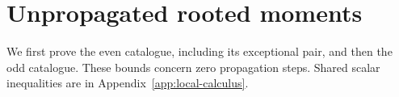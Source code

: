\section{Unpropagated rooted moments}\label{app:zero-moments}
We first prove the even catalogue, including its exceptional pair, and then the odd catalogue. These bounds concern zero propagation steps. Shared scalar inequalities are in Appendix~\ref{app:local-calculus}.














